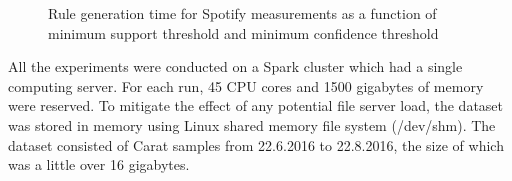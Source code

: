\begin{figure} %



\caption{Rule generation time for Spotify measurements as a function of minimum support threshold and minimum confidence threshold}
\label{figure:runtimes-spotify}
\end{figure}

All the experiments were conducted on a Spark cluster which had a single computing server. For each run, 45 CPU cores and 1500 gigabytes of memory were reserved. To mitigate the effect of any potential file server load, the dataset was stored in memory using Linux shared memory file system (/dev/shm). The dataset consisted of Carat samples from 22.6.2016 to 22.8.2016, the size of which was a little over 16 gigabytes.


